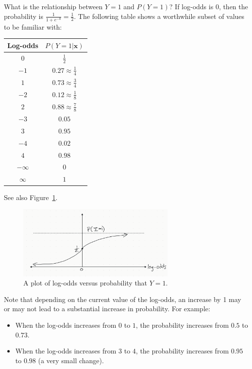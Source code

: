 \documentclass[12pt, a4paper]{article}
\theoremstyle{definition}
\begin{document}
	What is the relationship between $Y=1$ and $P(Y=1)$? If log-odds is $0$,
	then the probability is $\frac{1}{1 + e^{-0}} = \frac{1}{2}$. The following
	table shows a worthwhile subset of values to be familiar with:
	\begin{center}
		\begin{tabular}{c|c}
			Log-odds & $P(Y=1|\mathbf{x})$\\
			\hline
			$0$ & $\frac{1}{2}$ \\
			$-1$ & $0.27\approx \frac{1}{4}$\\
			$1$ & $0.73\approx \frac{3}{4}$\\
			$-2$ & $0.12\approx \frac{1}{8}$\\
			$2$ & $0.88\approx \frac{7}{8}$\\
			$-3$ & $0.05$\\
			$3$ & $0.95$\\
			$-4$ & $0.02$\\
			$4$ & $0.98$\\
			\hline
			$-\infty$ & $0$\\
			$\infty$ & $1$
		\end{tabular}
	\end{center}
	See also Figure~\ref{fig:log-odds-probability-plot}.
	\begin{figure}
		\centering
		\includegraphics[width=0.7\textwidth]{log-odds-probability-plot}
		\caption{A plot of log-odds versus probability that $Y=1$.}
		\label{fig:log-odds-probability-plot}
	\end{figure}
	Note that depending on the current value of the log-odds, an increase
	by 1 may or may not lead to a substantial increase in probability. For example:
	\begin{itemize}
		\item When the log-odds increases from $0$ to $1$, the probability increases
		from $0.5$ to $0.73$.
		\item When the log-odds increases from $3$ to $4$, the probability increases from
		$0.95$ to $0.98$ (a very small change).
	\end{itemize}
\end{document}
